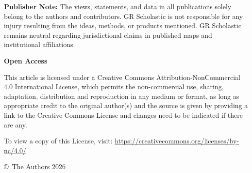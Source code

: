 \documentclass[a4paper]{article}
\begin{document}
\vspace{12pt}
\noindent\textbf{Publisher Note:} The views, statements, and data in all publications solely belong to the authors and contributors. GR Scholastic is not responsible for any injury resulting from the ideas, methods, or products mentioned. GR Scholastic remains neutral regarding jurisdictional claims in published maps and institutional affiliations.

\vspace{8pt}
\noindent\textbf{Open Access}

\noindent This article is licensed under a Creative Commons Attribution-NonCommercial 4.0 International License, which permits the non-commercial use, sharing, adaptation, distribution and reproduction in any medium or format, as long as appropriate credit to the original author(s) and the source is given by providing a link to the Creative Commons License and changes need to be indicated if there are any.

\noindent To view a copy of this License, visit: \url{https://creativecommons.org/licenses/by-nc/4.0/}

\vspace{4pt}
\noindent\copyright\ The Authors 2026
\end{document}
